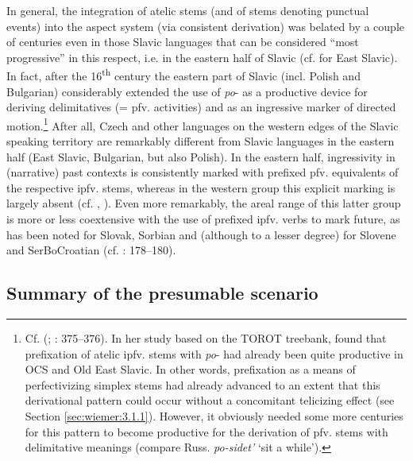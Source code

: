 \documentclass[output=paper,colorlinks,citecolor=brown]{langscibook}
\begin{document}
In general, the integration of atelic stems (and of stems denoting punctual events) into the aspect system (via consistent derivation) was belated by a couple of centuries even in those Slavic languages that can be considered “most progressive” in this respect, i.e. in the eastern half of Slavic (cf. \cite{Bermel1997} for East Slavic). In fact, after the 16\textsuperscript{th} century the eastern part of Slavic (incl. Polish and Bulgarian) considerably extended the use of \textit{po}- as a productive device for deriving delimitatives (= pfv. activities) and as an ingressive marker of directed motion.\footnote{Cf. \citeauthor{Dickey2011} (\citeyear{Dickey2011}; \citeyear{dickey_2018}: 375--376). In her study based on the TOROT treebank, \citet[]{eckhoff_2020} found that prefixation of atelic ipfv. stems with \textit{po}- had already been quite productive in OCS and Old East Slavic. In other words, prefixation as a means of perfectivizing simplex stems had already advanced to an extent that this derivational pattern could occur without a concomitant telicizing effect (see Section \ref{sec:wiemer:3.1.1}). However, it obviously needed some more centuries for this pattern to become productive for the derivation of pfv. stems with delimitative meanings (compare Russ. \textit{po-sidet’} ‘sit a while’).} After all, Czech and other languages on the western edges of the Slavic speaking territory are remarkably different from Slavic languages in the eastern half (East Slavic, Bulgarian, but also Polish). In the eastern half, ingressivity in (narrative) past contexts is consistently marked with prefixed pfv. equivalents of the respective ipfv. stems, whereas in the western group this explicit marking is largely absent (cf. \citealt{Ivančev1961}, \citealt{Berger2016}). Even more remarkably, the areal range of this latter group is more or less coextensive with the use of prefixed ipfv. verbs to mark future, as has been noted for Slovak, Sorbian and (although to a lesser degree) for Slovene and SerBoCroatian (cf. \citealt{Dickey2011}: 178--180).


\subsection{Summary of the presumable scenario}\label{sec:wiemer:4.4}
\end{document}
